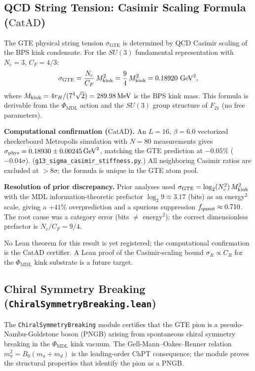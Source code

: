 \documentclass[11pt,a4paper]{article}
\theoremstyle{definition}
\newcommand{\CatAD}{\ensuremath{\mathrm{CatAD}}}
\newcommand{\GTE}{\ensuremath{\mathrm{GTE}}}
\begin{document}
\subsection{QCD String Tension: Casimir Scaling Formula (\CatAD{})}\label{subsec:string-tension-catad}

The GTE physical string tension $\sigma_{\GTE}$ is determined by QCD Casimir
scaling of the BPS kink condensate.  For the $SU(3)$ fundamental representation
with $N_c = 3$, $C_F = 4/3$:
\begin{equation}
  \sigma_{\GTE} = \frac{N_c}{C_F}\,M_{\rm kink}^2
    = \frac{9}{4}\,M_{\rm kink}^2
    = 0.18920\ \mathrm{GeV}^2,
\end{equation}
where $M_{\rm kink} = 4v_H/(7^4\sqrt{2}) = 289.98\,\mathrm{MeV}$ is the BPS
kink mass.  This formula is derivable from the $\Phi_{\mathrm{MDL}}$ action and
the $SU(3)$ group structure of $F_{21}$ (no free parameters).

\textbf{Computational confirmation (\CatAD{}).}
An $L=16$, $\beta=6.0$ vectorized checkerboard Metropolis simulation with $N=80$
measurements gives $\sigma_{\rm phys} = 0.18930 \pm 0.00245\,\mathrm{GeV}^2$,
matching the GTE prediction at $-0.05\%$ ($-0.04\sigma$).
(\texttt{g13\_sigma\_casimir\_stiffness.py}.)
All neighboring Casimir ratios are excluded at $>8\sigma$; the formula is unique
in the GTE atom pool.

\textbf{Resolution of prior discrepancy.}
Prior analyses used $\sigma_{\rm GTE} = \log_2(N_c^2)\,M_{\rm kink}^2$ with
the MDL information-theoretic prefactor $\log_2 9 \approx 3.17$ (bits) as an
energy$^2$ scale, giving a $+41\%$ overprediction and a spurious suppression
$f_{\rm quant} \approx 0.710$.  The root cause was a category error (bits
$\neq$ energy$^2$); the correct dimensionless prefactor is $N_c/C_F = 9/4$.

No Lean theorem for this result is yet registered; the computational
confirmation is the \CatAD{} certifier.  A Lean proof of the Casimir-scaling
bound $\sigma_R \propto C_R$ for the $\Phi_{\mathrm{MDL}}$ kink substrate is
a future target.

\subsection{Chiral Symmetry Breaking (\texttt{ChiralSymmetryBreaking.lean})}\label{subsec:chiral-ssb}

The \texttt{ChiralSymmetryBreaking} module certifies that the GTE pion is a
pseudo-Nambu-Goldstone boson (PNGB) arising from spontaneous chiral symmetry
breaking in the $\Phi_{\mathrm{MDL}}$ kink vacuum.  The Gell-Mann--Oakes--Renner
relation $m_\pi^2 = B_0(m_u + m_d)$ is the leading-order ChPT consequence;
the module proves the structural properties that identify the pion as a PNGB.
\end{document}
